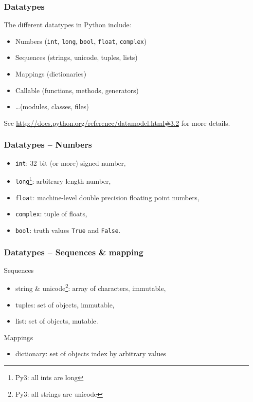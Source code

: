 \documentclass[xetex,10pt]{beamer}
\def\pythoni{\lstinline[language=pythontim]}
\def\spacer{\vspace*{1em}}
\newcommand{\pypypy}[1]{\footnote[frame]{Py3: #1}}
\begin{document}
\begin{frame}[fragile]
	\frametitle{Datatypes}
	
	The different datatypes in Python include:
	\spacer
	\begin{itemize}
		\item Numbers (\pythoni{int}, \pythoni{long}, \pythoni{bool}, \pythoni{float}, \pythoni{complex})
		\item Sequences (strings,  unicode, tuples, lists)
		\item Mappings (dictionaries)
		\item Callable (functions, methods, generators)
		\item \ldots (modules, classes, files)
	\end{itemize}
	
	\spacer
	See \url{http://docs.python.org/reference/datamodel.html\#3.2} for more details.
\end{frame}

\begin{frame}[fragile]
	\frametitle{Datatypes -- Numbers}

	\begin{itemize}
		\item \pythoni{int}: 32 bit (or more) signed number,
		\item \pythoni{long}\pypypy{all ints are long}: arbitrary length number,
		\item \pythoni{float}: machine-level double precision floating point numbers,
		\item \pythoni{complex}: tuple of floats,
		\item \pythoni{bool}: truth values \pythoni{True} and \pythoni{False}.
	\end{itemize}
\end{frame}

\begin{frame}[fragile]
	\frametitle{Datatypes -- Sequences \& mapping}
	
	Sequences
	\begin{itemize}
		\item string \& unicode\pypypy{all strings are unicode}: array of characters, immutable,
		\item tuples: set of objects, immutable,
		\item list: set of objects, mutable.
	\end{itemize}
	\spacer
	Mappings
	\begin{itemize}
		\item dictionary: set of objects index by arbitrary values
	\end{itemize}
\end{frame}
\end{document}
